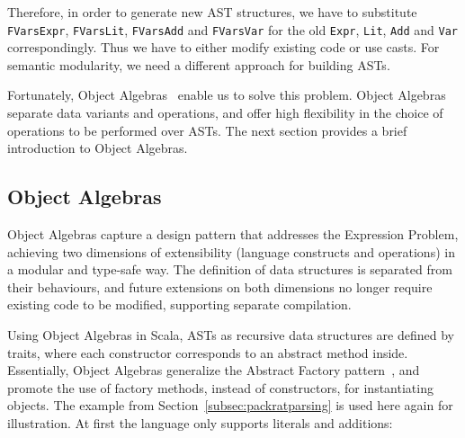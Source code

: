 Therefore, in order to generate new AST structures, we have to
substitute \lstinline{FVarsExpr}, \lstinline{FVarsLit},
\lstinline{FVarsAdd} and \lstinline{FVarsVar} for the old
\lstinline{Expr}, \lstinline{Lit}, \lstinline{Add} and \lstinline{Var}
correspondingly. Thus we have to either modify existing code or 
use casts. For semantic modularity, we need a different approach for building ASTs.


Fortunately, Object Algebras~\cite{Oliveira:2012} enable us to solve
this problem. Object Algebras separate data variants and
operations, and offer high flexibility in the choice of operations to
be performed over ASTs. The next section provides a brief introduction 
to Object Algebras.

\subsection{Object Algebras}\label{subsec:objectalgebras}

Object Algebras capture a design pattern that addresses the Expression
Problem, achieving two dimensions of extensibility (language
constructs and operations) in a modular and type-safe way. The
definition of data structures is separated from their behaviours, and
future extensions on both dimensions no longer require existing code
to be modified, supporting separate compilation.

Using Object Algebras in Scala, ASTs as recursive data structures are defined by traits, where each constructor corresponds to an abstract method inside.
Essentially, Object Algebras generalize the {\sc Abstract Factory} pattern~\cite{gamma1995design}, and promote the use of factory methods, instead of constructors, for instantiating objects. The example from Section~\ref{subsec:packratparsing} is used here again for illustration.
At first the language only supports literals and additions:

